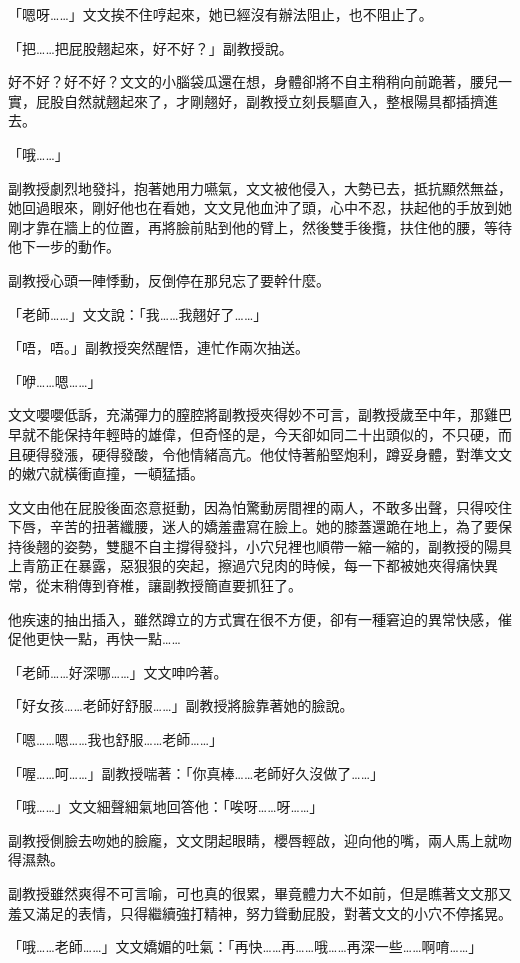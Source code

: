 「嗯呀……」文文挨不住哼起來，她已經沒有辦法阻止，也不阻止了。

「把……把屁股翹起來，好不好？」副教授說。

好不好？好不好？文文的小腦袋瓜還在想，身體卻將不自主稍稍向前跪著，腰兒一實，屁股自然就翹起來了，才剛翹好，副教授立刻長驅直入，整根陽具都插擠進去。

「哦……」

副教授劇烈地發抖，抱著她用力嚥氣，文文被他侵入，大勢已去，抵抗顯然無益，她回過眼來，剛好他也在看她，文文見他血沖了頭，心中不忍，扶起他的手放到她剛才靠在牆上的位置，再將臉前貼到他的臂上，然後雙手後攬，扶住他的腰，等待他下一步的動作。

副教授心頭一陣悸動，反倒停在那兒忘了要幹什麼。

「老師……」文文說：「我……我翹好了……」

「唔，唔。」副教授突然醒悟，連忙作兩次抽送。

「咿……嗯……」

文文嚶嚶低訴，充滿彈力的膣腔將副教授夾得妙不可言，副教授歲至中年，那雞巴早就不能保持年輕時的雄偉，但奇怪的是，今天卻如同二十出頭似的，不只硬，而且硬得發漲，硬得發酸，令他情緒高亢。他仗恃著船堅炮利，蹲妥身體，對準文文的嫩穴就橫衝直撞，一頓猛插。

文文由他在屁股後面恣意挺動，因為怕驚動房間裡的兩人，不敢多出聲，只得咬住下唇，辛苦的扭著纖腰，迷人的嬌羞盡寫在臉上。她的膝蓋還跪在地上，為了要保持後翹的姿勢，雙腿不自主撐得發抖，小穴兒裡也順帶一縮一縮的，副教授的陽具上青筋正在暴露，惡狠狠的突起，擦過穴兒肉的時候，每一下都被她夾得痛快異常，從末稍傳到脊椎，讓副教授簡直要抓狂了。

他疾速的抽出插入，雖然蹲立的方式實在很不方便，卻有一種窘迫的異常快感，催促他更快一點，再快一點……

「老師……好深哪……」文文呻吟著。

「好女孩……老師好舒服……」副教授將臉靠著她的臉說。

「嗯……嗯……我也舒服……老師……」

「喔……呵……」副教授喘著：「你真棒……老師好久沒做了……」

「哦……」文文細聲細氣地回答他：「唉呀……呀……」

副教授側臉去吻她的臉龐，文文閉起眼睛，櫻唇輕啟，迎向他的嘴，兩人馬上就吻得濕熱。

副教授雖然爽得不可言喻，可也真的很累，畢竟體力大不如前，但是瞧著文文那又羞又滿足的表情，只得繼續強打精神，努力聳動屁股，對著文文的小穴不停搖晃。

「哦……老師……」文文嬌媚的吐氣：「再快……再……哦……再深一些……啊唷……」

